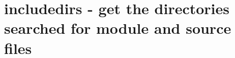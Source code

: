 %        
%        
%        
%        
%
%        
%        
%        






    \section{includedirs - get the directories searched for module and source files}\label{sec:ifincldirs}
        
